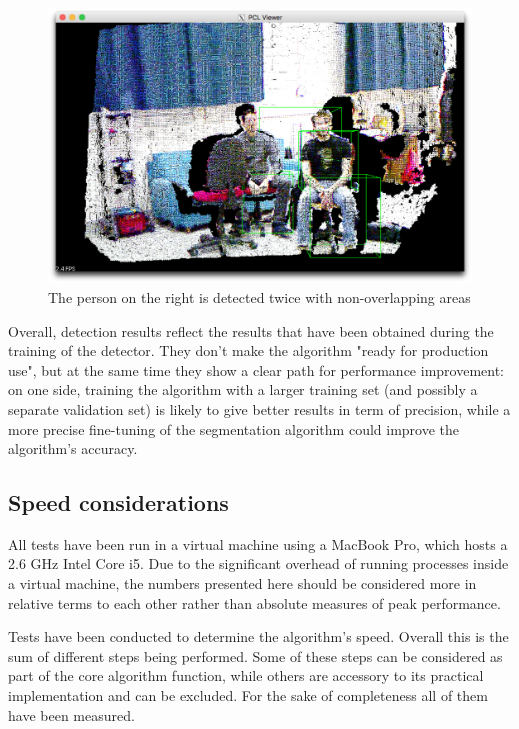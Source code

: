 \documentclass[a4paper,11pt,titlepage]{article}
\begin{document}
\begin{figure}[h]
  \centering
  \includegraphics[scale=0.2]{multiple_detections.png}
  \caption{The person on the right is detected twice with non-overlapping
  areas}
  \label{fig:multiple_detections}
\end{figure}

Overall, detection results reflect the results that have been obtained during
the training of the detector. They don't make the algorithm "ready for
production use", but at the same time they show a clear path for performance
improvement: on one side, training the algorithm with a larger training set (and
possibly a separate validation set) is likely to give better results in term of
precision, while a more precise fine-tuning of the segmentation algorithm could
improve the algorithm's accuracy.

\subsection{Speed considerations}
All tests have been run in a virtual machine using a MacBook Pro, which hosts a
2.6 GHz Intel Core i5. Due to the significant overhead of running processes
inside a virtual machine, the numbers presented here should be considered
more in relative terms to each other rather than absolute measures of peak
performance.

Tests have been conducted to determine the algorithm's speed. Overall this is
the sum of different steps being performed. Some of these steps can be
considered as part of the core algorithm function, while others are accessory to
its practical implementation and can be excluded. For the sake of completeness
all of them have been measured.
\end{document}
